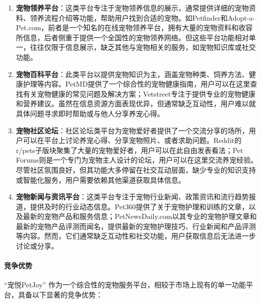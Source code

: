 \begin{enumerate}
    \item \textbf{宠物领养平台}：这类平台专注于宠物领养信息的展示，通常提供详细的宠物资料、领养流程介绍等功能，帮助用户找到合适的宠物。如Petfinder和Adopt-a-Pet.com，前者是一个知名的在线宠物领养平台，拥有大量的宠物资料和收容所信息，后者侧重于提供一个全国性的宠物领养网络。但这些平台功能相对单一，往往仅限于信息展示，缺乏其他与宠物相关的服务，如宠物知识库或社交功能。
    \item \textbf{宠物百科平台}：此类平台以提供宠物知识为主，涵盖宠物种类、饲养方法、健康护理等内容。PetMD提供了一个综合性的宠物健康指南，用户可以在这里查找有关宠物健康的常见问题及解决方案；Vetstreet专注于提供专业的宠物健康和营养建议。虽然在信息资源方面表现优异，但通常缺乏互动性，用户难以就具体问题寻求即时帮助或与他人分享养宠心得。
    \item \textbf{宠物社区论坛}：社区论坛类平台为宠物爱好者提供了一个交流分享的场所，用户可以在平台上讨论养宠心得、分享宠物照片、或者求助问题。Reddit的r/pets子版块聚集了大量的宠物爱好者，用户可以在此自由发表看法；Pet Forums则是一个专门为宠物主人设计的论坛，用户可以在这里交流养宠经验。尽管社区氛围良好，但其功能大多停留在社交互动层面，缺少专业的知识支持或智能化服务，用户需要依赖其他渠道获取具体信息。
    \item \textbf{宠物新闻与资讯平台}：这类平台专注于宠物行业新闻、政策资讯和流行趋势报道，提供及时的行业动态信息。Pet360提供了关于宠物护理和训练的文章，以及最新的宠物产品和服务信息；PetNewsDaily.com以其专业的宠物护理文章和最新的宠物产品评测而闻名，提供最新的宠物护理技巧、行业新闻和产品评测等内容。然而，它们通常缺乏互动性和社交功能，用户获取信息后无法进一步讨论或分享。
\end{enumerate}

\paragraph{竞争优势}

“宠悦PetJoy” 作为一个综合性的宠物服务平台，相较于市场上现有的单一功能平台，具备以下显著的竞争优势：

